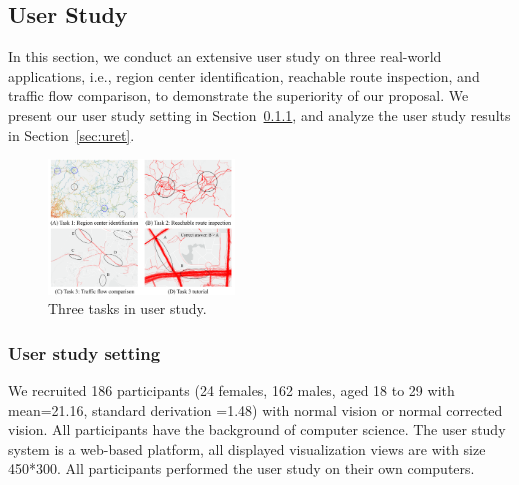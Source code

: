 \subsection{User Study}\label{sec:user}
In this section, we conduct an extensive user study on three real-world applications, i.e., region center identification, reachable route inspection, and traffic flow comparison, to demonstrate the superiority of our proposal.
We present our user study setting in Section~\ref{sec:uset}, and analyze the user study results in Section~\ref{sec:uret}.



\begin{figure}[t]
	\centering
	\includegraphics[width=0.44\textwidth]{pictures/user_study/interface.pdf}
	\vspace{-3mm}
	\caption{Three tasks in user study.}
	\label{fig:apps}
	\vspace{-6mm}
\end{figure}

\subsubsection{User study setting}\label{sec:uset}

We recruited 186 participants (24 females, 162 males, aged 18 to 29 with mean=21.16, standard derivation =1.48) with normal vision or normal corrected vision.
All participants have the background of computer science.
The user study system is a web-based platform, all displayed visualization views are with size 450*300.
All participants performed the user study on their own computers.


